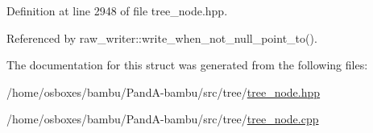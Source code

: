 Definition at line 2948 of file tree\+\_\+node.\+hpp.



Referenced by raw\+\_\+writer\+::write\+\_\+when\+\_\+not\+\_\+null\+\_\+point\+\_\+to().



The documentation for this struct was generated from the following files\+:\begin{DoxyCompactItemize}
\item 
/home/osboxes/bambu/\+Pand\+A-\/bambu/src/tree/\hyperlink{tree__node_8hpp}{tree\+\_\+node.\+hpp}\item 
/home/osboxes/bambu/\+Pand\+A-\/bambu/src/tree/\hyperlink{tree__node_8cpp}{tree\+\_\+node.\+cpp}\end{DoxyCompactItemize}
